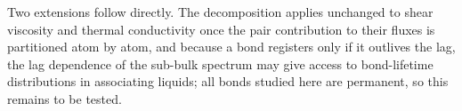 Two extensions follow directly.
The decomposition applies unchanged to shear viscosity and thermal conductivity once the pair contribution to their fluxes is partitioned atom by atom, and because a bond registers only if it outlives the lag, the lag dependence of the sub-bulk spectrum may give access to bond-lifetime distributions in associating liquids; all bonds studied here are permanent, so this remains to be tested.
